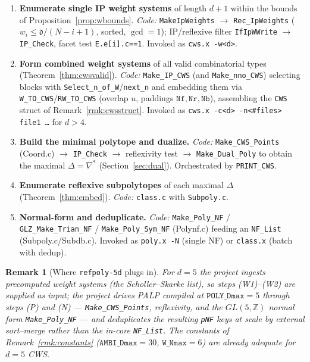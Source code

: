 \documentclass{amsart}
\newtheorem{remark}[theorem]{Remark}
\begin{document}
\begin{enumerate}
  \item[\textbf{(W1)}] \textbf{Enumerate single IP weight systems} of length
        $d{+}1$ within the bounds of Proposition~\ref{prop:wbounds}.
        \emph{Code:} \texttt{MakeIpWeights} $\to$ \texttt{Rec\_IpWeights}
        ($w_i\le \mathfrak d/(N{-}i{+}1)$, sorted, $\gcd=1$); IP/reflexive
        filter \texttt{IfIpWWrite} $\to$ \texttt{IP\_Check}, facet test
        \texttt{E.e[i].c==1}. Invoked as \texttt{cws.x -w<d>}.
  \item[\textbf{(W2)}] \textbf{Form combined weight systems} of all valid
        combinatorial types (Theorem~\ref{thm:cwsvalid}). \emph{Code:}
        \texttt{Make\_IP\_CWS} (and \texttt{Make\_nno\_CWS}) selecting blocks
        with \texttt{Select\_n\_of\_W}/\texttt{next\_n} and embedding them via
        \texttt{W\_TO\_CWS}/\texttt{RW\_TO\_CWS} (overlap $u$, paddings
        $\texttt{Nf},\texttt{Nr},\texttt{Nb}$), assembling the \texttt{CWS}
        struct of Remark~\ref{rmk:cwsstruct}. Invoked as
        \texttt{cws.x -c<d> -n<\#files> file1 \dots} for $d>4$.
  \item[\textbf{(P)}] \textbf{Build the minimal polytope and dualize.}
        \emph{Code:} \texttt{Make\_CWS\_Points} (Coord.c) $\to$
        \texttt{IP\_Check} $\to$ reflexivity test $\to$
        \texttt{Make\_Dual\_Poly} to obtain the maximal
        $\Delta = \nabla^*$ (Section~\ref{sec:dual}). Orchestrated by
        \texttt{PRINT\_CWS}.
  \item[\textbf{(S)}] \textbf{Enumerate reflexive subpolytopes} of each
        maximal $\Delta$ (Theorem~\ref{thm:embed}). \emph{Code:}
        \texttt{class.c} with \texttt{Subpoly.c}.
  \item[\textbf{(N)}] \textbf{Normal-form and deduplicate.} \emph{Code:}
        \texttt{Make\_Poly\_NF} / \texttt{GLZ\_Make\_Trian\_NF} /
        \texttt{Make\_Poly\_Sym\_NF} (Polynf.c) feeding an \texttt{NF\_List}
        (Subpoly.c/Subdb.c). Invoked as \texttt{poly.x -N} (single NF) or
        \texttt{class.x} (batch with dedup).
\end{enumerate}

\begin{remark}[Where \texttt{refpoly-5d} plugs in]\label{rmk:refpoly5d-algo}
For $d=5$ the project ingests precomputed weight systems (the
Scholler--Skarke list), so steps (W1)--(W2) are supplied as input; the
project drives PALP compiled at $\texttt{POLY\_Dmax}=5$ through steps
(P) and (N) --- \texttt{Make\_CWS\_Points}, reflexivity, and the
$GL(5,\mathbb{Z})$ normal form \texttt{Make\_Poly\_NF} --- and deduplicates
the resulting \texttt{pNF} keys at scale by external sort--merge rather than
the in-core \texttt{NF\_List}. The constants of Remark~\ref{rmk:constants}
($\texttt{AMBI\_Dmax}=30$, $\texttt{W\_Nmax}=6$) are already adequate for
$d=5$ CWS.
\end{remark}
\end{document}
